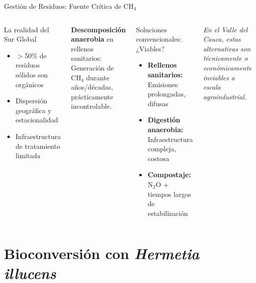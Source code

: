 \documentclass[aspectratio=169, 11pt]{beamer}
\begin{document}
\begin{frame}{Gestión de Residuos: Fuente Crítica de CH$_4$}
    \begin{columns}[T]
        \begin{block}{La realidad del Sur Global}
            \begin{itemize}
                \item $>$50\% de residuos sólidos son orgánicos
                \item Dispersión geográfica y estacionalidad
                \item Infraestructura de tratamiento limitada
            \end{itemize}
        \end{block}

        \vspace{0.3cm}
        \textbf{Descomposición anaerobia} en rellenos sanitarios:\\
        \small Generación de CH$_4$ durante años/décadas, prácticamente incontrolable.

        \begin{alertblock}{Soluciones convencionales: ¿Viables?}
            \begin{itemize}
                \item \textbf{Rellenos sanitarios:} Emisiones prolongadas, difusas
                \item \textbf{Digestión anaerobia:} Infraestructura compleja, costosa
                \item \textbf{Compostaje:} N$_2$O + tiempos largos de estabilización
            \end{itemize}
        \end{alertblock}

        \vspace{0.3cm}
        \centering
        \footnotesize \textit{En el Valle del Cauca, estas alternativas son técnicamente o económicamente inviables a escala agroindustrial.}
    \end{columns}
\end{frame}

\section{Bioconversión con \textit{Hermetia illucens}}
\end{document}
